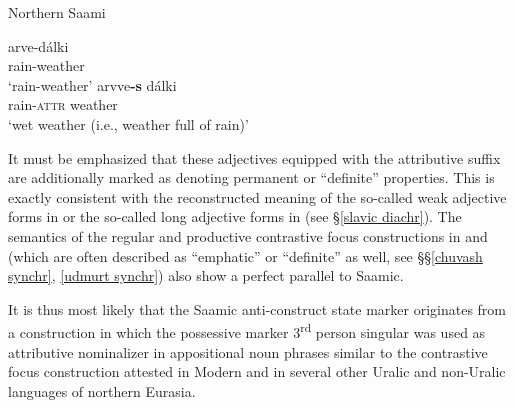 {%
\begin{exe}
\ex
\begin{xlist}
\ex \rm{Northern Saami \citep[48]{bergsland1976}}
\begin{xlist}
\ex
\gll	arve-dálki\\
	rain-weather\\
\glt	‘rain-weather’
\ex
\gll	arvve\textbf{-s} dálki\\
	rain-\textsc{attr} weather\\
\glt	‘wet weather (i.e., weather full of rain)’
\end{xlist}
\end{xlist}
\end{exe}
It must be emphasized that these adjectives equipped with the attributive suffix are additionally marked as denoting permanent or “definite” properties. This is exactly consistent with the reconstructed meaning of the so-called weak adjective forms in  or the so-called long adjective forms in  (see \S\ref{slavic diachr}). The semantics of the regular and productive contrastive focus constructions in  and  (which are often described as “emphatic” or “definite” as well, see \S\S\ref{chuvash synchr}, \ref{udmurt synchr}) also show a perfect parallel to Saamic.

It is thus most likely that the Saamic anti\hyp{}construct state marker originates from a construction in which the possessive marker 3\textsuperscript{rd} person singular was used as attributive nominalizer in appositional noun phrases similar to the contrastive focus construction attested in Modern  and in several other Uralic and non-Uralic languages of northern Eurasia.

}

